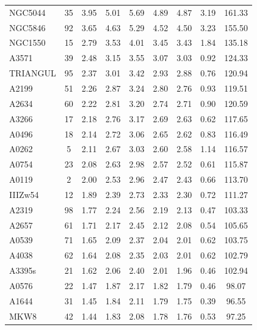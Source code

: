 \documentclass[10pt,aps,pra,reprint,amsmath,amsfonts,amssymb,showpacs,nofootinbib,floatfix]{revtex4-1}
\newcommand{\vstt}{\vspace{-0.0mm}}
\begin{document}
\begin{table}
\begin{minipage}{2.0\columnwidth}
\begin{tabular}{l c c c c c c c c}
NGC5044  &  35 &   3.95 &   5.01 &   5.69 &   4.89 &   4.87 &   3.19 & 161.33 \vstt \\
NGC5846  &  92 &   3.65 &   4.63 &   5.29 &   4.52 &   4.50 &   3.23 & 155.50 \vstt \\
NGC1550  &  15 &   2.79 &   3.53 &   4.01 &   3.45 &   3.43 &   1.84 & 135.18 \vstt \\
A3571    &  39 &   2.48 &   3.15 &   3.55 &   3.07 &   3.03 &   0.92 & 124.33 \vstt \\
TRIANGUL &  95 &   2.37 &   3.01 &   3.42 &   2.93 &   2.88 &   0.76 & 120.94 \vstt \\
A2199    &  51 &   2.26 &   2.87 &   3.24 &   2.80 &   2.76 &   0.93 & 119.51 \vstt \\
A2634    &  60 &   2.22 &   2.81 &   3.20 &   2.74 &   2.71 &   0.90 & 120.59 \vstt \\
A3266    &  17 &   2.18 &   2.76 &   3.17 &   2.69 &   2.63 &   0.62 & 117.65 \vstt \\
A0496    &  18 &   2.14 &   2.72 &   3.06 &   2.65 &   2.62 &   0.83 & 116.49 \vstt \\
A0262    &   5 &   2.11 &   2.67 &   3.03 &   2.60 &   2.58 &   1.14 & 116.57 \vstt \\
A0754    &  23 &   2.08 &   2.63 &   2.98 &   2.57 &   2.52 &   0.61 & 115.87 \vstt \\
A0119    &   2 &   2.00 &   2.53 &   2.96 &   2.47 &   2.43 &   0.66 & 113.70 \vstt \\
IIIZw54  &  12 &   1.89 &   2.39 &   2.73 &   2.33 &   2.30 &   0.72 & 111.27 \vstt \\
A2319    &  98 &   1.77 &   2.24 &   2.56 &   2.19 &   2.13 &   0.47 & 103.33 \vstt \\
A2657    &  61 &   1.71 &   2.17 &   2.45 &   2.12 &   2.08 &   0.54 & 105.65 \vstt \\
A0539    &  71 &   1.65 &   2.09 &   2.37 &   2.04 &   2.01 &   0.62 & 103.75 \vstt \\
A4038    &  62 &   1.64 &   2.08 &   2.35 &   2.03 &   2.01 &   0.62 & 102.79 \vstt \\
A3395s   &  21 &   1.62 &   2.06 &   2.40 &   2.01 &   1.96 &   0.46 & 102.94 \vstt \\
A0576    &  22 &   1.47 &   1.87 &   2.17 &   1.82 &   1.79 &   0.46 &  98.07 \vstt \\
A1644    &  31 &   1.45 &   1.84 &   2.11 &   1.79 &   1.75 &   0.39 &  96.55 \vstt \\
MKW8     &  42 &   1.44 &   1.83 &   2.08 &   1.78 &   1.76 &   0.53 &  97.25 \vstt \\

\end{tabular}
\end{minipage}
\end{table}
\end{document}
